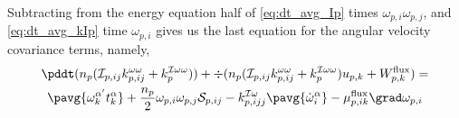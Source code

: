 Subtracting from the energy equation half of \ref{eq:dt_avg_Ip} times $\omega_{p,i}\omega_{p,j}$, and \ref{eq:dt_avg_kIp} time $\omega_{p,i}$ gives us the last equation for the angular velocity covariance terms, namely, 
\begin{multline}
    \pddt (n_p (\mathcal{I}_{p,ij} k^{\omega\omega}_{p,ij}+k^{\mathcal{I}\omega\omega}_{p}))
    + \div  (
        n_p (\mathcal{I}_{p,ij} k^{\omega\omega}_{p,ij}+k^{\mathcal{I}\omega\omega}_{p}) u_{p,k}
    + W_{p,k}^\text{flux}
    )
    = \\
    \pavg{\omega_k^{\alpha'} t^\alpha_k} 
    + \frac{n_p}{2}\omega_{p,i} \omega_{p,j} \mathcal{S}_{p,ij}
    - k^{\mathcal{I}\omega}_{p,ijj} \pavg{\dot{\omega}^\alpha_i}
    - \mu_{p,ik}^\text{flux} \grad\omega_{p,i}
    \label{eq:dt_avg_kpww}
\end{multline}
